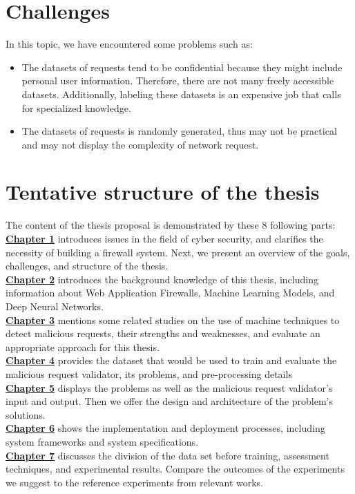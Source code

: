 \section{Challenges}
\label{sec:challenges}
In this topic, we have encountered some problems such as:
\begin{itemize}
	\item The datasets of requests tend to be confidential because they might include personal user information. Therefore, there are not many freely accessible datasets. Additionally, labeling these datasets is an expensive job that calls for specialized knowledge.
	\item The datasets of requests is randomly generated, thus may not be practical and may not display the complexity of network request.
\end{itemize}
\newpage
\section{Tentative structure of the thesis}
\label{sec:structure}
	\newcommand\nextintro{\\[4mm]}
	The content of the thesis proposal is demonstrated by these 8 following parts: \nextintro
	\hyperref[chap:introduction]{\textbf{Chapter 1}} introduces issues in the field of cyber security, and clarifies the necessity of building a firewall system. Next, we present an overview of the goals, challenges, and structure of the thesis.\nextintro
	\hyperref[chap:backgrounds]{\textbf{Chapter 2}} introduces the background knowledge of this thesis, including information about Web Application Firewalls, Machine Learning Models, and Deep Neural Networks.\nextintro
	\hyperref[chap:literaturereview]{\textbf{Chapter 3}} mentions some related studies on the use of machine techniques to detect malicious requests, their strengths and weaknesses, and evaluate an appropriate approach for this thesis.\nextintro
	\hyperref[chap:dataset]{\textbf{Chapter 4}} provides the dataset that would be used to train and evaluate the malicious request validator, its problems, and pre-processing details\nextintro
	\hyperref[chap:proposed_approach]{\textbf{Chapter 5}} displays the problems as well as the malicious request validator's input and output. Then we offer the design and architecture of the problem's solutions.\nextintro
	\hyperref[chap:implementation]{\textbf{Chapter 6}} shows the implementation and deployment processes, including system frameworks and system specifications.\nextintro
	\hyperref[chap:experiments]{\textbf{Chapter 7}} discusses the division of the data set before training, assessment techniques, and experimental results. Compare the outcomes of the experiments we suggest to the reference experiments from relevant works.\nextintro
